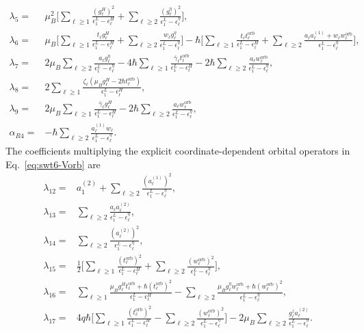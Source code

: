 \documentclass[10pt,letterpaper]{article}
\newcommand{\ep}{\epsilon}
\begin{document}
\begin{align}
 \lambda_5={}&\mu_B^2\Biggl[
 \sum_{\ell\ge1}\frac{(g_\ell^H)^2}{\ep_1^L-\ep_\ell^H}
 +\sum_{\ell\ge2}\frac{(g_\ell^\eta)^2}{\ep_1^L-\ep_\ell^\eta}\Biggr],\label{eq:swt6-lambda5}\\
 \lambda_6={}&\mu_B\Biggl[
 \sum_{\ell\ge1}\frac{t_\ell g_\ell^H}{\ep_1^L-\ep_\ell^H}
 +\sum_{\ell\ge2}\frac{w_\ell g_\ell^\eta}{\ep_1^L-\ep_\ell^\eta}\Biggr]
 -\hbar\Biggl[
 \sum_{\ell\ge1}\frac{t_\ell t_\ell^{\mathrm{orb}}}{\ep_1^L-\ep_\ell^H}
 +\sum_{\ell\ge2}\frac{a_\ell a_\ell^{(1)}+w_\ell w_\ell^{\mathrm{orb}}}{\ep_1^L-\ep_\ell^\eta}\Biggr],\label{eq:swt6-lambda6}\\
 \lambda_7={}&2\mu_B\sum_{\ell\ge2}
 \frac{a_\ell g_\ell^\eta}{\ep_1^L-\ep_\ell^\eta}
 -4\hbar\sum_{\ell\ge1}
 \frac{\bar\gamma_\ell t_\ell^{\mathrm{orb}}}{\ep_1^L-\ep_\ell^H}
 -2\hbar\sum_{\ell\ge2}
 \frac{a_\ell w_\ell^{\mathrm{orb}}}{\ep_1^L-\ep_\ell^\eta},\nonumber\\
 \lambda_8={}&2\sum_{\ell\ge1}
 \frac{\zeta_\ell(\mu_Bg_\ell^H-2\hbar t_\ell^{\mathrm{orb}})}{\ep_1^L-\ep_\ell^H},\\
 \lambda_9={}&2\mu_B\sum_{\ell\ge1}
 \frac{\bar\gamma_\ell g_\ell^H}{\ep_1^L-\ep_\ell^H}
 -2\hbar\sum_{\ell\ge2}
 \frac{a_\ell w_\ell^{\mathrm{orb}}}{\ep_1^L-\ep_\ell^\eta},\nonumber\\
 \alpha_{R4}={}&-\hbar\sum_{\ell\ge2}
 \frac{a_\ell^{(1)}w_\ell}{\ep_1^L-\ep_\ell^\eta}.
 \label{eq:swt6-magnetic-coeff}
\end{align}
The coefficients multiplying the explicit coordinate-dependent orbital
operators in Eq.~\eqref{eq:swt6-Vorb} are
\begin{align}
 \lambda_{12}={}&a_1^{(2)}
 +\sum_{\ell\ge2}\frac{(a_\ell^{(1)})^2}{\ep_1^L-\ep_\ell^\eta},\\
 \lambda_{13}={}&\sum_{\ell\ge2}
 \frac{a_\ell a_\ell^{(2)}}{\ep_1^L-\ep_\ell^\eta},\\
 \lambda_{14}={}&\sum_{\ell\ge2}
 \frac{(a_\ell^{(2)})^2}{\ep_1^L-\ep_\ell^\eta},\\
 \lambda_{15}={}&\frac12\Biggl[
 \sum_{\ell\ge1}\frac{(t_\ell^{\mathrm{orb}})^2}{\ep_1^L-\ep_\ell^H}
 +\sum_{\ell\ge2}\frac{(w_\ell^{\mathrm{orb}})^2}{\ep_1^L-\ep_\ell^\eta}\Biggr],\\
 \lambda_{16}={}&\sum_{\ell\ge1}
 \frac{\mu_Bg_\ell^H t_\ell^{\mathrm{orb}}+\hbar(t_\ell^{\mathrm{orb}})^2}
 {\ep_1^L-\ep_\ell^H}
 -\sum_{\ell\ge2}
 \frac{\mu_Bg_\ell^\eta w_\ell^{\mathrm{orb}}+\hbar(w_\ell^{\mathrm{orb}})^2}
 {\ep_1^L-\ep_\ell^\eta},\nonumber\\
 \lambda_{17}={}&4q\hbar\Biggl[
 \sum_{\ell\ge1}\frac{(t_\ell^{\mathrm{orb}})^2}{\ep_1^L-\ep_\ell^H}
 -\sum_{\ell\ge2}\frac{(w_\ell^{\mathrm{orb}})^2}{\ep_1^L-\ep_\ell^\eta}\Biggr]
 -2\mu_B\sum_{\ell\ge2}
 \frac{g_\ell^z a_\ell^{(2)}}{\ep_1^L-\ep_\ell^\eta}.
 \label{eq:swt6-orb-lambda}
\end{align}
\end{document}
